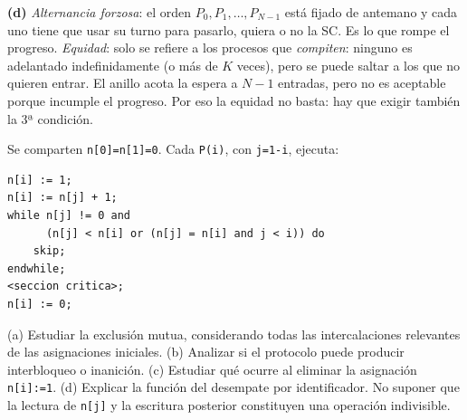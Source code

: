 \begin{solucion}
\textbf{(d)} \emph{Alternancia forzosa}: el orden $P_0, P_1, \dots, P_{N-1}$ está fijado de antemano y cada uno tiene
que usar su turno para pasarlo, quiera o no la SC. Es lo que rompe el progreso. \emph{Equidad}: solo se refiere a
los procesos que \emph{compiten}: ninguno es adelantado indefinidamente (o más de $K$ veces), pero se puede saltar a
los que no quieren entrar. El anillo acota la espera a $N-1$ entradas, pero no es aceptable porque incumple el
progreso. Por eso la equidad no basta: hay que exigir también la 3ª condición.
\end{solucion}

\begin{ejercicio}
Se comparten \texttt{n[0]=n[1]=0}. Cada \texttt{P(i)}, con \texttt{j=1-i}, ejecuta:
\begin{lstlisting}
n[i] := 1;
n[i] := n[j] + 1;
while n[j] != 0 and
      (n[j] < n[i] or (n[j] = n[i] and j < i)) do
    skip;
endwhile;
<seccion critica>;
n[i] := 0;
\end{lstlisting}
(a) Estudiar la exclusión mutua, considerando todas las intercalaciones relevantes de las asignaciones iniciales.
(b) Analizar si el protocolo puede producir interbloqueo o inanición. (c) Estudiar qué ocurre al eliminar la
asignación \texttt{n[i]:=1}. (d) Explicar la función del desempate por identificador. No suponer que la lectura de
\texttt{n[j]} y la escritura posterior constituyen una operación indivisible.
\end{ejercicio}
